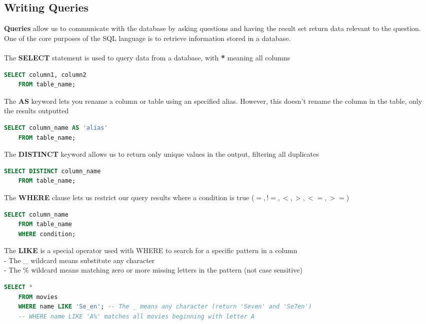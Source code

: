 \documentclass[11pt, a4paper]{article}
\begin{document}
\begin{spacing}{1.1}
	\subsection{Writing Queries}
	\textbf{Queries} allow us to communicate with the database by asking questions and having the result set return data relevant to the question. One of the core purposes of the SQL language is to retrieve information stored in a database. \\~\\
	The \textbf{SELECT} statement is used to query data from a database, with \textbf{*} meaning all columns 
	\begin{lstlisting}[language=SQL]
	SELECT column1, column2 
	FROM table_name; \end{lstlisting} \vspace*{1mm}
	The \textbf{AS} keyword lets you rename a column or table using an specified alias. However, this doesn't rename the column in the table, only the results outputted
	\begin{lstlisting}[language=SQL]
	SELECT column_name AS 'alias'
	FROM table_name; \end{lstlisting} \vspace*{1mm}
	The \textbf{DISTINCT} keyword allows us to return only unique values in the output, filtering all duplicates
	\begin{lstlisting}[language=SQL]
	SELECT DISTINCT column_name 
	FROM table_name; \end{lstlisting} \vspace*{1mm}
	The \textbf{WHERE} clause lets us restrict our query results where a condition is true ($=,!=,<,>,<=,>=$)
	\begin{lstlisting}[language=SQL]
	SELECT column_name 
	FROM table_name 
	WHERE condition; \end{lstlisting} \vspace*{1mm}
	The \textbf{LIKE} is a special operator used with WHERE to search for a specific pattern in a column \\
	\hspace*{3mm} - The \_ wildcard means substitute any character\\
	\hspace*{3mm} - The \% wildcard means matching zero or more missing letters in the pattern (not case sensitive)
	\begin{lstlisting}[language=SQL]
	SELECT * 
	FROM movies
	WHERE name LIKE 'Se_en'; -- The _ means any character (return 'Seven' and 'Se7en')
	-- WHERE name LIKE 'A%' matches all movies beginning with letter A

\end{lstlisting}
\end{spacing}
\end{document}
